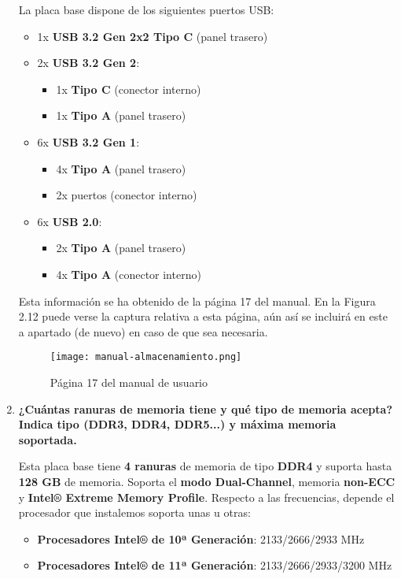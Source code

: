 \begin{enumerate}
    La placa base dispone de los siguientes puertos USB:
    \begin{itemize}
        \item 1x \textbf{USB 3.2 Gen 2x2 Tipo C} (panel trasero)
        \item 2x \textbf{USB 3.2 Gen 2}:
        \begin{itemize}
            \item 1x \textbf{Tipo C} (conector interno)
            \item 1x \textbf{Tipo A} (panel trasero)
        \end{itemize}
        \item 6x \textbf{USB 3.2 Gen 1}:
        \begin{itemize}
            \item 4x \textbf{Tipo A} (panel trasero)
            \item 2x puertos (conector interno)
        \end{itemize}

        \item 6x \textbf{USB 2.0}:
        \begin{itemize}
            \item 2x \textbf{Tipo A} (panel trasero)
            \item 4x \textbf{Tipo A} (conector interno)
        \end{itemize}
    \end{itemize}

    Esta información se ha obtenido de la página 17 del manual. En la Figura 2.12 puede verse la captura relativa a esta página, aún así se incluirá en este a apartado (de nuevo) en caso de que sea necesaria.

    \begin{figure}[ht]
        \centering
        \texttt{[image: manual-almacenamiento.png]}
        \caption{Página 17 del manual de usuario}
    \end{figure}

    \item \textbf{¿Cuántas ranuras de memoria tiene y qué tipo de memoria acepta? Indica tipo (DDR3, DDR4, DDR5...) y máxima memoria soportada.}

    Esta placa base tiene \textbf{4 ranuras} de memoria de tipo \textbf{DDR4} y suporta hasta \textbf{128 GB} de memoria. Soporta el \textbf{modo Dual-Channel}, memoria \textbf{non-ECC} y \textbf{Intel® Extreme Memory Profile}. Respecto a las frecuencias, depende el procesador que instalemos soporta unas u otras:
    \begin{itemize}
        \item \textbf{Procesadores Intel® de 10ª Generación}: 2133/2666/2933 MHz
        \item \textbf{Procesadores Intel® de 11ª Generación}: 2133/2666/2933/3200 MHz
    \end{itemize}


\end{enumerate}
